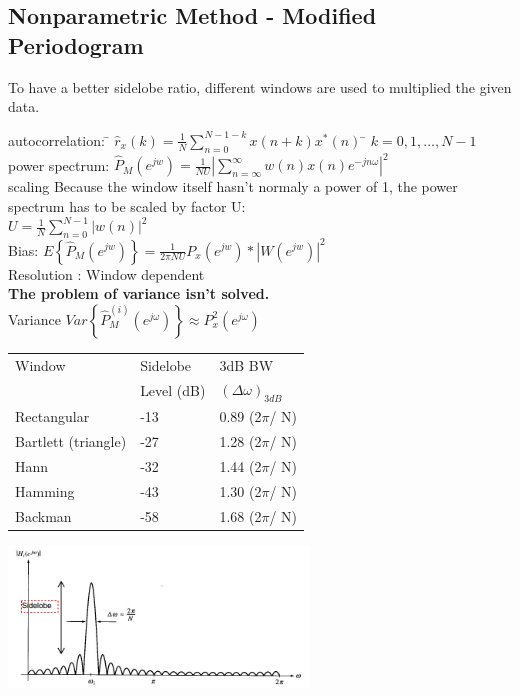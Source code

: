 \subsection{Nonparametric Method - Modified Periodogram }
To have a better sidelobe ratio, different windows are used to multiplied the given data.
\begin{tabbing}
autocorrelation: 	\= $\hat{r}_x(k) =\frac{1}{N} \sum \limits_{n=0}^{N-1-k} x(n+k)x^*(n)$   \hspace{4cm} \= $k=0,1,\ldots,N-1$ \\
power spectrum:  	\>  $\hat{P}_{M}(e^{jw}) = \frac{1}{NU}  \left\lvert \sum\limits_{n=\infty}^{\infty} w(n)x(n)e^{-jn\omega} \right\rvert ^2$   \\
scaling 			\> Because the window itself hasn't normaly a power of 1, the power spectrum has to be scaled by factor U:\\
\>					$U=\frac{1}{N} \sum\limits_{n=0}^{N-1}|w(n)|^2$\\
Bias: 				\>  $E\left\lbrace \hat{P}_{M}(e^{jw}) \right\rbrace = \frac{1}{2 \pi NU}P_x(e^{jw})*|W(e^{jw})|^2$\\
Resolution : 		\>  Window dependent\\
\textbf{The problem of variance isn't solved.}\\
Variance 			\> $Var\left\lbrace \hat{P}_{M}^{(i)}(e^{j\omega}) \right\rbrace \approx P^2_x(e^{j\omega})$\\
\end{tabbing}

\begin{minipage}{10cm}
\begin{tabular}{p{3cm} p{3cm} p{3cm}}
Window	 &  	Sidelobe 	&3dB BW\\
&				Level (dB)	& $(\Delta\omega)_{3dB}$\\
\hline
Rectangular&			-13	&		0.89 (2$\pi$/ N)\\
Bartlett (triangle)&	-27	&		1.28 (2$\pi$/ N)\\
Hann				&	-32	&		1.44 (2$\pi$/ N)\\
Hamming&				-43	&		1.30 (2$\pi$/ N)\\
Backman		&			-58	&		1.68 (2$\pi$/ N)
\end{tabular}
\end{minipage}
\begin{minipage}{8cm}
\includegraphics[width=8cm]{./bilder/sidelobe.jpg}
\end{minipage}





